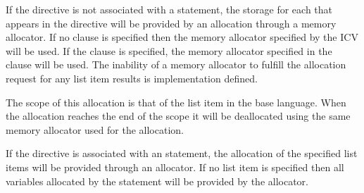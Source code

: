 \descr

If the directive is not associated with a statement, the storage for each  that appears in the directive will be provided by an allocation through a memory allocator. If no clause is specified then the memory allocator specified by the  ICV will be used. If the  clause is specified, the memory allocator specified in the clause will be used. The inability of a memory allocator to fulfill the allocation request for any list item results is implementation defined.

The scope of this allocation is that of the list item in the base language. When the allocation reaches the end of the scope it will be deallocated using the same memory allocator used for the allocation. %

\begin{fortranspecific}
If the directive is associated with an  statement, the allocation of the specified list items will be provided through an allocator. If no list item is specified then all variables allocated by the  statement will be provided by the allocator.
\end{fortranspecific}


